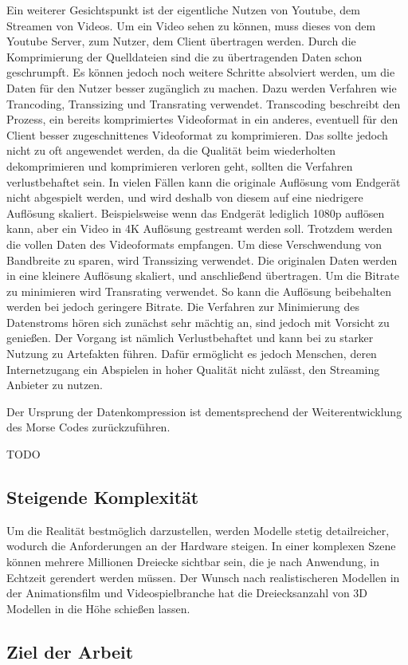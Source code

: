 Ein weiterer Gesichtspunkt ist der eigentliche Nutzen von Youtube, dem Streamen von Videos.
Um ein Video sehen zu können, muss dieses von dem Youtube Server, zum Nutzer, dem Client übertragen werden.
Durch die Komprimierung der Quelldateien sind die zu übertragenden Daten schon geschrumpft.
Es können jedoch noch weitere Schritte absolviert werden, um die Daten für den Nutzer besser zugänglich zu machen.
Dazu werden Verfahren wie Trancoding, Transsizing und Transrating verwendet.
Transcoding beschreibt den Prozess, ein bereits komprimiertes Videoformat in ein anderes, eventuell für den Client besser zugeschnittenes Videoformat zu komprimieren.
Das sollte jedoch nicht zu oft angewendet werden, da die Qualität beim wiederholten dekomprimieren und komprimieren verloren geht, sollten die Verfahren verlustbehaftet sein. \newline
In vielen Fällen kann die originale Auflösung vom Endgerät nicht abgespielt werden, und wird deshalb von diesem auf eine niedrigere Auflösung skaliert.
Beispielsweise wenn das Endgerät lediglich 1080p auflösen kann, aber ein Video in 4K Auflösung gestreamt werden soll.
Trotzdem werden die vollen Daten des Videoformats empfangen.
Um diese Verschwendung von Bandbreite zu sparen, wird Transsizing verwendet.
Die originalen Daten werden in eine kleinere Auflösung skaliert, und anschließend übertragen. \newline
Um die Bitrate zu minimieren wird Transrating verwendet.
So kann die Auflösung beibehalten werden bei jedoch geringere Bitrate.
Die Verfahren zur Minimierung des Datenstroms hören sich zunächst sehr mächtig an, sind jedoch mit Vorsicht zu genießen.
Der Vorgang ist nämlich Verlustbehaftet und kann bei zu starker Nutzung zu Artefakten führen.
Dafür ermöglicht es jedoch Menschen, deren Internetzugang ein Abspielen in hoher Qualität nicht zulässt, den Streaming Anbieter zu nutzen.

Der Ursprung der Datenkompression ist dementsprechend der Weiterentwicklung des Morse Codes zurückzuführen. 

TODO

\subsection{Steigende Komplexität}
\label{subsec:steigende_komplexität}
Um die Realität bestmöglich darzustellen, werden Modelle stetig detailreicher, wodurch die Anforderungen an der Hardware steigen. In einer komplexen Szene können mehrere Millionen Dreiecke sichtbar sein, die je nach Anwendung, in Echtzeit gerendert werden müssen. Der Wunsch nach realistischeren Modellen in der Animationsfilm und Videospielbranche hat die Dreiecksanzahl von 3D Modellen in die Höhe schießen lassen. 

\subsection{Ziel der Arbeit}
